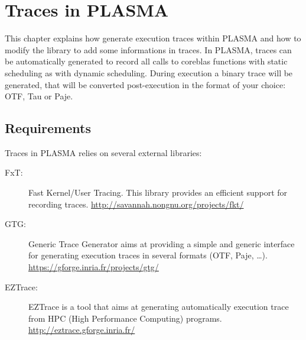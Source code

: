 
\chapter{Traces in PLASMA}

This chapter explains how generate execution traces within PLASMA and
how to modify the library to add some informations in traces.  
In PLASMA, traces can be automatically generated to record all calls
to coreblas functions with static scheduling as with dynamic
scheduling. During execution a binary trace will be generated, that
will be converted post-execution in the format of your choice: OTF, Tau or
Paje. 

\section{Requirements}

Traces in PLASMA relies on several external libraries:
\begin{description}
   \item[{\sc FxT}:] Fast Kernel/User Tracing. This library provides an efficient
     support for recording traces.\newline
     \url{http://savannah.nongnu.org/projects/fkt/}
   \item[{\sc GTG}:] Generic Trace Generator aims at providing a simple and
    generic interface for generating execution traces in several formats
    (OTF, Paje, \dots).\newline
    \url{https://gforge.inria.fr/projects/gtg/}
  \item[{\sc EZTrace}:] EZTrace is a tool that aims at generating
    automatically execution trace from HPC (High Performance Computing)
    programs.\newline
    \url{http://eztrace.gforge.inria.fr/}
\end{description}
 
